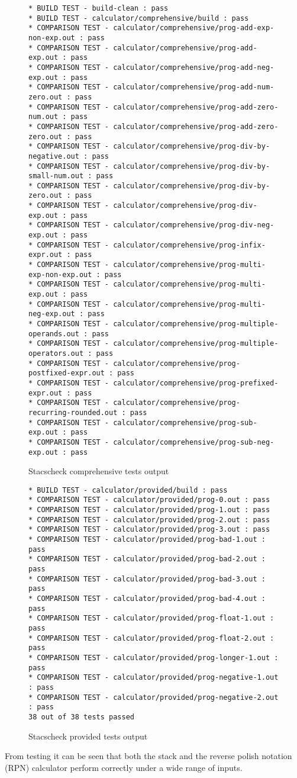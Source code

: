 \documentclass{article}
\begin{document}
\begin{figure}[H]
\begin{verbatim}
* BUILD TEST - build-clean : pass
* BUILD TEST - calculator/comprehensive/build : pass
* COMPARISON TEST - calculator/comprehensive/prog-add-exp-non-exp.out : pass
* COMPARISON TEST - calculator/comprehensive/prog-add-exp.out : pass
* COMPARISON TEST - calculator/comprehensive/prog-add-neg-exp.out : pass
* COMPARISON TEST - calculator/comprehensive/prog-add-num-zero.out : pass
* COMPARISON TEST - calculator/comprehensive/prog-add-zero-num.out : pass
* COMPARISON TEST - calculator/comprehensive/prog-add-zero-zero.out : pass
* COMPARISON TEST - calculator/comprehensive/prog-div-by-negative.out : pass
* COMPARISON TEST - calculator/comprehensive/prog-div-by-small-num.out : pass
* COMPARISON TEST - calculator/comprehensive/prog-div-by-zero.out : pass
* COMPARISON TEST - calculator/comprehensive/prog-div-exp.out : pass
* COMPARISON TEST - calculator/comprehensive/prog-div-neg-exp.out : pass
* COMPARISON TEST - calculator/comprehensive/prog-infix-expr.out : pass
* COMPARISON TEST - calculator/comprehensive/prog-multi-exp-non-exp.out : pass
* COMPARISON TEST - calculator/comprehensive/prog-multi-exp.out : pass
* COMPARISON TEST - calculator/comprehensive/prog-multi-neg-exp.out : pass
* COMPARISON TEST - calculator/comprehensive/prog-multiple-operands.out : pass
* COMPARISON TEST - calculator/comprehensive/prog-multiple-operators.out : pass
* COMPARISON TEST - calculator/comprehensive/prog-postfixed-expr.out : pass
* COMPARISON TEST - calculator/comprehensive/prog-prefixed-expr.out : pass
* COMPARISON TEST - calculator/comprehensive/prog-recurring-rounded.out : pass
* COMPARISON TEST - calculator/comprehensive/prog-sub-exp.out : pass
* COMPARISON TEST - calculator/comprehensive/prog-sub-neg-exp.out : pass
\end{verbatim}
\caption{Stacscheck comprehensive tests output}
\end{figure}

\begin{figure}[H]
\begin{verbatim}
* BUILD TEST - calculator/provided/build : pass
* COMPARISON TEST - calculator/provided/prog-0.out : pass
* COMPARISON TEST - calculator/provided/prog-1.out : pass
* COMPARISON TEST - calculator/provided/prog-2.out : pass
* COMPARISON TEST - calculator/provided/prog-3.out : pass
* COMPARISON TEST - calculator/provided/prog-bad-1.out : pass
* COMPARISON TEST - calculator/provided/prog-bad-2.out : pass
* COMPARISON TEST - calculator/provided/prog-bad-3.out : pass
* COMPARISON TEST - calculator/provided/prog-bad-4.out : pass
* COMPARISON TEST - calculator/provided/prog-float-1.out : pass
* COMPARISON TEST - calculator/provided/prog-float-2.out : pass
* COMPARISON TEST - calculator/provided/prog-longer-1.out : pass
* COMPARISON TEST - calculator/provided/prog-negative-1.out : pass
* COMPARISON TEST - calculator/provided/prog-negative-2.out : pass
38 out of 38 tests passed
\end{verbatim}
\caption{Stacscheck provided tests output}
\end{figure}
\noindent From testing it can be seen that both the stack and the reverse polish notation (RPN) calculator perform correctly under a wide range of inputs.
\end{document}
